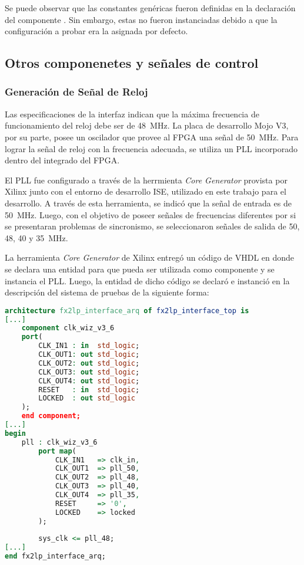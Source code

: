 		Se puede observar que las constantes genéricas fueron definidas en la declaración del componente . Sin embargo, estas no fueron instanciadas debido a que la configuración a probar era la asignada por defecto.
		
\subsection{Otros componenetes y señales de control }

	\subsubsection{Generación de Señal de Reloj}
		Las especificaciones de la interfaz indican que la máxima frecuencia de funcionamiento del reloj debe ser de \SI{48}{\mega\hertz}\cite{Cypress2017}. La placa de desarrollo Mojo V3, por su parte, posee un oscilador que provee al FPGA una señal de \SI{50}{\mega\hertz}. Para lograr la señal de reloj con la frecuencia adecuada, se utiliza un PLL incorporado dentro del integrado del FPGA. 
		
		El PLL fue configurado a través de la herrmienta {\it Core Generator} provista por Xilinx junto con el entorno de desarrollo ISE, utilizado en este trabajo para el desarrollo\cite{XilinxInc}. A través de esta herramienta, se indicó que la señal de entrada es de \SI{50}{\mega\hertz}. Luego, con el objetivo de poseer señales de frecuencias diferentes por si se presentaran problemas de sincronismo, se seleccionaron señales de salida de \si{50}, \si{48}, \si{40} y \SI{35}{\mega\hertz}.
		
		La herramienta {\it Core Generator} de Xilinx entregó un código de VHDL en donde se declara una entidad para que pueda ser utilizada como componente y se instancia el PLL. Luego, la entidad de dicho código se declaró e instanció en la descripción del sistema de pruebas de la siguiente forma:
		
		\begin{lstlisting}[language=VHDL,backgroundcolor=\color{gray!30}]
architecture fx2lp_interface_arq of fx2lp_interface_top is
[...]
	component clk_wiz_v3_6
	port(
		CLK_IN1 : in  std_logic;
		CLK_OUT1: out std_logic;
		CLK_OUT2: out std_logic;
		CLK_OUT3: out std_logic;
		CLK_OUT4: out std_logic;
		RESET   : in  std_logic;
		LOCKED  : out std_logic
	);
	end component;
[...]
begin
	pll : clk_wiz_v3_6 
		port map(
			CLK_IN1   => clk_in,
			CLK_OUT1  => pll_50,
			CLK_OUT2  => pll_48,
			CLK_OUT3  => pll_40,
			CLK_OUT4  => pll_35,
			RESET     => '0',
			LOCKED    => locked
		);
	
		sys_clk <= pll_48;
[...]
end fx2lp_interface_arq;
		\end{lstlisting}
		

